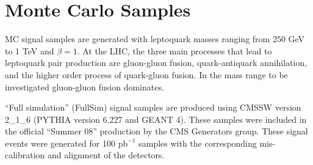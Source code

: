 
%

\section{Monte Carlo Samples} \label{sec:MCSamples}



MC signal samples are generated with leptoquark masses ranging from 250 GeV to 1 TeV and $\beta=1$. 
At the LHC, the three main processes that lead to leptoquark pair production are gluon-gluon fusion, 
quark-antiquark annihilation, and the higher order process of quark-gluon fusion. In the mass range to be investigated gluon-gluon fusion dominates. 

``Full simulation'' (FullSim) signal samples are produced using 
CMSSW version 2\_1\_6 (PYTHIA version 6.227 and GEANT 4). 
These samples were included in the official ``Summer 08'' production by the CMS Generators group.
These signal events were generated for 100 $\mbox{pb}^{-1}$ samples with the corresponding mis-calibration and alignment 
of the detectors. 

